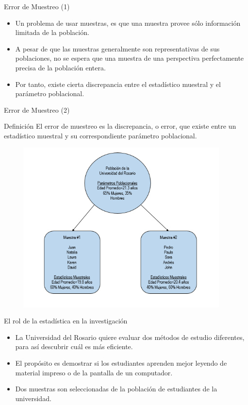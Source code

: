 \documentclass[xcolor=dvipsnames]{beamer}
\begin{document}
\begin{frame}{Error de Muestreo (1)}
\begin{itemize}
\justifying
\item Un problema de usar muestras, es que una muestra provee sólo información limitada de la población. 
\item A pesar de que las muestras generalmente son representativas de sus poblaciones, no se espera que una muestra de una perspectiva perfectamente precisa de la población entera. 
\item Por tanto, existe cierta discrepancia entre el estadístico muestral y el parámetro poblacional.
\end{itemize}
\end{frame}

\begin{frame}{Error de Muestreo (2)}
	\begin{block}{Definición}
		\centering
	El error de muestreo es la discrepancia, o error, que existe entre un estadístico muestral y su correspondiente parámetro poblacional.
	\end{block}
\end{frame}

\begin{frame}
		\begin{figure}[H]
			\includegraphics[width = 0.95\textwidth]{./graf6}
		\end{figure}
\end{frame}

\begin{frame}{El rol de la estadística en la investigación}
\begin{itemize}
\justifying
\item La Universidad del Rosario quiere evaluar dos métodos de estudio diferentes, para así descubrir cuál es más eficiente.
\item El propósito es demostrar si los estudiantes aprenden mejor leyendo de material impreso o de la pantalla de un computador.
\item Dos muestras son seleccionadas de la población de estudiantes de la universidad. 
\end{itemize}
\end{frame}
\end{document}
